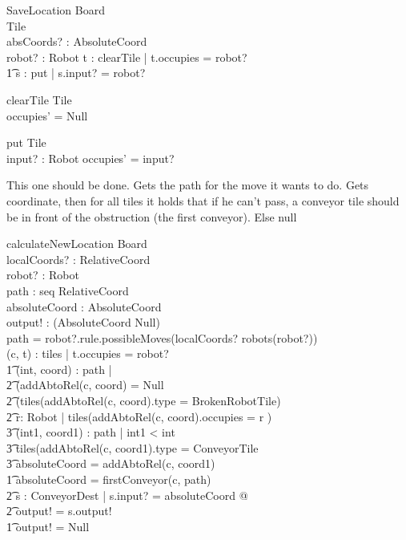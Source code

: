 \documentclass[a4paper,11pt]{article}
\begin{document}
\begin{schema}{SaveLocation}
\Xi Board \\
\Delta Tile \\
absCoords? : AbsoluteCoord \\
robot? : Robot
\where
\exists t : clearTile | t.occupies = robot?\\ \t1
\exists s : put | s.input? = robot?
\end{schema}

\begin{schema}{clearTile}
\Delta Tile \\
\where
occupies' = Null
\end{schema}

\begin{schema}{put}
\Delta Tile \\
input? : Robot
\where
occupies' = input?
\end{schema}

This one should be done. Gets the path for the move it wants to do. Gets coordinate, then for all tiles it holds that if he can't pass, a conveyor tile should be in front of the obstruction (the first conveyor). Else null
\begin{schema}{calculateNewLocation}
\Xi Board \\
localCoords? : RelativeCoord \\
robot? : Robot \\
path : seq RelativeCoord \\
absoluteCoord : AbsoluteCoord \\
output! : (AbsoluteCoord \union Null) \\
\where
path = robot?.rule.possibleMoves(localCoords? \cross robots(robot?)) \\
\exists (c, t) : tiles | t.occupies = robot? \implies \\ \t1
\IF
\forall (int, coord) : path | \\ \t2
(addAbtoRel(c, coord) = Null \vee \\ \t2
(tiles(addAbtoRel(c, coord).type = BrokenRobotTile) \vee \\ \t2
\exists r: Robot | tiles(addAbtoRel(c, coord).occupies = r )\implies \\ \t3
\exists (int1, coord1) : path | int1 < int \\ \t3
tiles(addAbtoRel(c, coord1).type = ConveyorTile \\ \t3
absoluteCoord = addAbtoRel(c, coord1) \\ \t1
\THEN absoluteCoord = firstConveyor(c, path) \\ \t2
\exists s : ConveyorDest | s.input? = absoluteCoord @ \\ \t2
output! = s.output! \\ \t1
\ELSE output! = Null
\end{schema}
\end{document}
